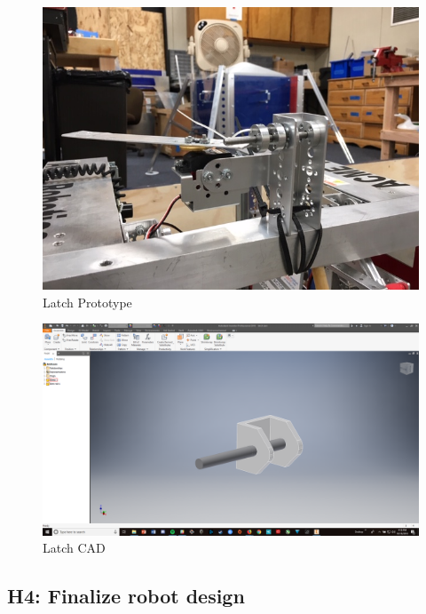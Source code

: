 \documentclass{article}
\begin{document}
\begin{figure}
    \centering
    \includegraphics[width=.6 \textwidth]{06_10-08/images/latch1.JPG}
    \caption{Latch Prototype}
    \label{fig: Latch CAD1}
\end{figure}

\begin{figure}
    \centering
    \includegraphics[width=.6 \textwidth]{06_10-08/images/latch.png}
    \caption{Latch CAD}
    \label{fig: Latch CAD2}
\end{figure}

\subsection{H4: Finalize robot design}
\end{document}
